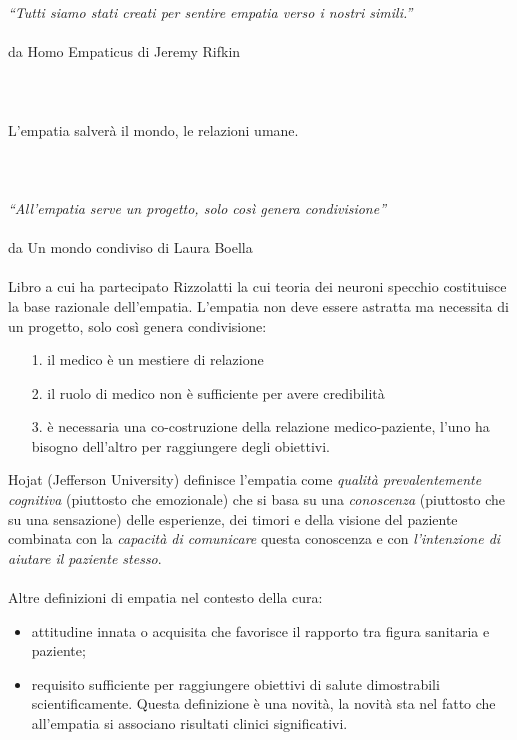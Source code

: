 \emph{``Tutti siamo stati creati per sentire empatia verso i nostri
simili.''}
\\\\
da Homo Empaticus di Jeremy Rifkin
\\\\\\\\
L'empatia salverà il mondo, le relazioni umane.
\\\\\\\\
\emph{``All'empatia serve un progetto, solo così genera condivisione''}
\\\\
da Un mondo condiviso di Laura Boella
\\\\
Libro a cui ha partecipato Rizzolatti la cui teoria dei neuroni specchio
costituisce la base razionale dell'empatia. L'empatia non deve essere
astratta ma necessita di un progetto, solo così genera condivisione:

\begin{itemize}
\item[1.]
  il medico è un mestiere di relazione
\item[2.]
  il ruolo di medico non è sufficiente per avere credibilità
\item[3.]
  è necessaria una co-costruzione della relazione medico-paziente, l'uno
  ha bisogno dell'altro per raggiungere degli obiettivi.
\end{itemize}

Hojat (Jefferson University) definisce l'empatia come \emph{qualità
prevalentemente cognitiva} (piuttosto che emozionale) che si basa su una
\emph{conoscenza} (piuttosto che su una sensazione) delle esperienze,
dei timori e della visione del paziente combinata con la \emph{capacità
di comunicare} questa conoscenza e con \emph{l'intenzione di aiutare il
paziente stesso}.
\\\\
Altre definizioni di empatia nel contesto della cura:

\begin{itemize}
\item
  attitudine innata o acquisita che favorisce il rapporto tra figura
  sanitaria e paziente;
\item
  requisito sufficiente per raggiungere obiettivi di salute dimostrabili
  scientificamente. Questa definizione è una novità, la novità sta nel
  fatto che all'empatia si associano risultati clinici significativi.
\end{itemize}

